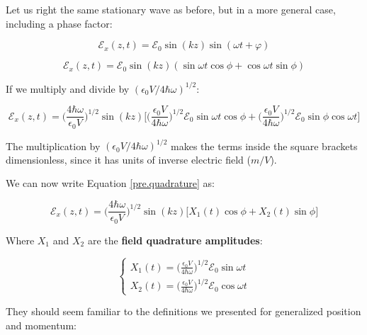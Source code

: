 \documentclass[12pt,a4paper]{report}
\begin{document}
Let us right the same stationary wave as before, but in a more general case, including a phase factor:

\begin{equation}
    \mathcal{E}_x(z,t)=\mathcal{E}_0\sin(kz)\sin(\omega t+\varphi)
\end{equation}

\begin{equation}
    \mathcal{E}_x(z,t)=\mathcal{E}_0\sin(kz)(\sin{\omega t}\cos{\phi}+\cos{\omega t}\sin{\phi})
\end{equation}

If we multiply and divide by $(\epsilon_0V/4\hbar\omega)^{1/2}$:

\begin{equation*}
    \mathcal{E}_x(z,t)=
    \Big(\frac{4\hbar\omega}{\epsilon_0V}\Big)^{1/2}
    \sin(kz)
    \Bigg[
    \Big(\frac{\epsilon_0V}{4\hbar\omega}\Big)^{1/2} \mathcal{E}_0\sin{\omega t}\cos{\phi}
    +
    \Big(\frac{\epsilon_0V}{4\hbar\omega}\Big)^{1/2} \mathcal{E}_0\sin{\phi}\cos{\omega t}
    \Bigg]
    \label{pre.quadrature}
\end{equation*}

The multiplication by $(\epsilon_0V/4\hbar\omega)^{1/2}$ makes the terms inside the square brackets dimensionless, since it has units of inverse electric field ($m/V$).

We can now write Equation \ref{pre.quadrature} as:

\begin{equation*}
    \mathcal{E}_x(z,t)=
    \Big(\frac{4\hbar\omega}{\epsilon_0V}\Big)^{1/2}
    \sin(kz)
    \Big[
    X_1(t)\cos{\phi}
    +
    X_2(t)\sin{\phi}
    \Big]
    \label{pre.quadrature}
\end{equation*}

Where $X_1$ and $X_2$ are the \textbf{field quadrature amplitudes}:

\begin{equation}
    \begin{cases}
        X_1(t)= \Big(\frac{\epsilon_0V}{4\hbar\omega}\Big)^{1/2} \mathcal{E}_0\sin{\omega t}\\[0.3cm]
        X_2(t)=\Big(\frac{\epsilon_0V}{4\hbar\omega}\Big)^{1/2} \mathcal{E}_0\cos{\omega t}
    \end{cases}
    \label{field.quad.amplitudes.equations}
\end{equation}


They should seem familiar to the definitions we presented for generalized position and momentum:
\end{document}

